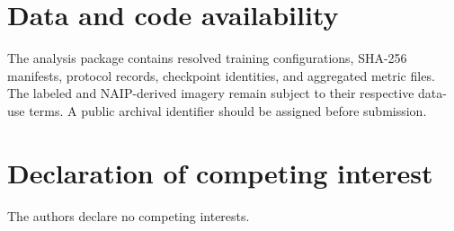 \documentclass[preprint,12pt,authoryear]{elsarticle}
\begin{document}
\section*{Data and code availability}

The analysis package contains resolved training configurations, SHA-256 manifests, protocol records, checkpoint identities, and aggregated metric files. The labeled and NAIP-derived imagery remain subject to their respective data-use terms. A public archival identifier should be assigned before submission.

\section*{Declaration of competing interest}

The authors declare no competing interests.



\end{document}

